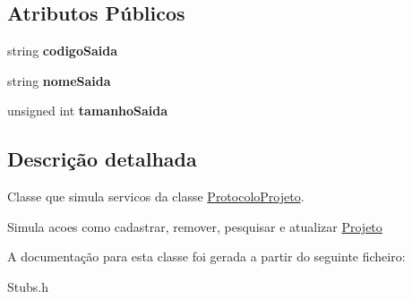 \subsection*{\-Atributos \-Públicos}
\begin{DoxyCompactItemize}
\item 
\hypertarget{class_stub_modulo_a9bc8593126dab6fb368bdf6b9765762b}{
string {\bfseries codigo\-Saida}}
\label{class_stub_modulo_a9bc8593126dab6fb368bdf6b9765762b}

\item 
\hypertarget{class_stub_modulo_a860047f783bb6c9a4a9b701392fc442f}{
string {\bfseries nome\-Saida}}
\label{class_stub_modulo_a860047f783bb6c9a4a9b701392fc442f}

\item 
\hypertarget{class_stub_modulo_a7bb8a0cad02c80cf0f968f4783e2eba4}{
unsigned int {\bfseries tamanho\-Saida}}
\label{class_stub_modulo_a7bb8a0cad02c80cf0f968f4783e2eba4}

\end{DoxyCompactItemize}


\subsection{\-Descrição detalhada}
\-Classe que simula servicos da classe \hyperlink{class_protocolo_projeto}{\-Protocolo\-Projeto}. 

\-Simula acoes como cadastrar, remover, pesquisar e atualizar \hyperlink{class_projeto}{\-Projeto} 

\-A documentação para esta classe foi gerada a partir do seguinte ficheiro\-:\begin{DoxyCompactItemize}
\item 
\-Stubs.\-h\end{DoxyCompactItemize}
